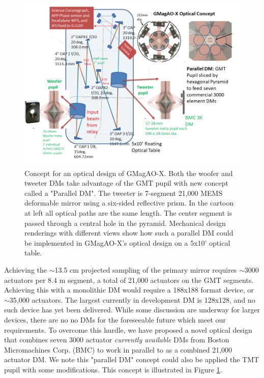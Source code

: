 \documentclass[12pt,preprint]{aastex}
\begin{document}
\begin{figure} [h!]
\centering
\includegraphics[width=5in]{figures/Possible_Optical_design_GMagAOX_V2.png}
\caption{ Concept for an optical design of GMagAO-X. Both the woofer and tweeter DMs take advantage of the GMT pupil with new concept called a "Parallel DM". The tweeter is 7-segment 21,000 MEMS deformable mirror using a six-sided reflective prism.  In the cartoon at left all optical paths are the same length. The center segment is passed through a central hole in the pyramid. Mechanical design renderings with different views show how such a parallel DM could be implemented in GMagAO-X's optical design on a 5x10' optical table.  \label{fig:pardm}}
\vspace{-0.1in}
\end{figure}

Achieving the $\sim$13.5 cm projected sampling of the primary mirror requires $\sim$3000 actuators per 8.4 m segment, a total of 21,000 actuators on the GMT segments.   Achieving this with a monolithic DM would require a 188x188 format device, or $\sim$35,000 actuators. The largest currently in development DM is 128x128, and no such device has yet been delivered.  While some discussion are underway for larger devices, there are no no DMs for the foreseeable future which meet our requirements. To overcome this hurdle, we have proposed a novel optical design that combines seven 3000 actuator \textit{currently available} DMs from Boston Micromachines Corp. (BMC) to work in parallel to as a combined 21,000 actuator DM. We note this "parallel DM" concept could also be applied the TMT pupil with some modifications.  This concept is illustrated in Figure \ref{fig:pardm}.
\end{document}
